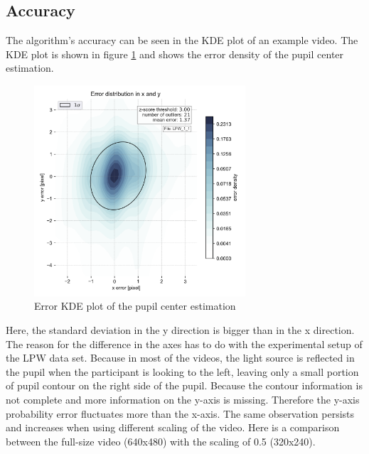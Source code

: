 \subsection{Accuracy}
The algorithm's accuracy can be seen in the KDE plot of an example video. The KDE plot is shown in figure \ref{fig:kde} and shows the error density of the pupil center estimation. 

\begin{figure}[h]
        \centering
        \includegraphics[width=0.7\textwidth]{plots/LPW_1_1pre.png}
    \caption{Error KDE plot of the pupil center estimation}
    \label{fig:kde}
\end{figure}
Here, the standard deviation in the y direction is bigger than in the x direction. The reason for the difference in the axes has to do with the experimental setup of the LPW data set. Because in most of the videos, the light source is reflected in the pupil when the participant is looking to the left, leaving only a small portion of pupil contour on the right side of the pupil. Because the contour information is not complete and more information on the y-axis is missing. Therefore the y-axis probability error fluctuates more than the x-axis. The same observation persists and increases when using different scaling of the video. Here is a comparison between the full-size video (640x480) with the scaling of 0.5 (320x240). 

